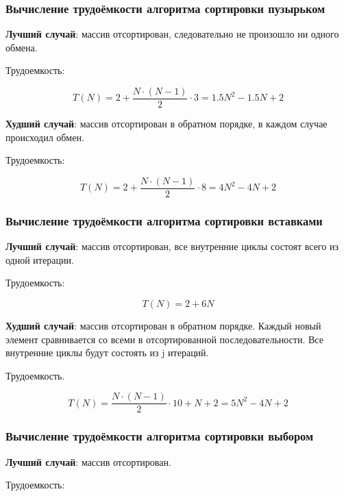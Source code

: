 \documentclass[14pt,russian]{scrartcl}
\begin{document}
\subsubsection{Вычисление трудоёмкости алгоритма сортировки пузырьком}

\textbf{Лучший случай}: массив отсортирован, следовательно не произошло ни одного обмена.

Трудоемкость:

\begin{equation}
    T(N) = 2 + \frac{N \cdot (N - 1)}{2}\cdot 3 = 1.5N^2 - 1.5N + 2
\end{equation}

\textbf{Худший случай}: массив отсортирован в обратном порядке, в каждом случае происходил обмен.

Трудоемкость:

\begin{equation}
    T(N) = 2 + \frac{N \cdot (N - 1)}{2}\cdot 8 = 4N^2 - 4N + 2
\end{equation}

\subsubsection{Вычисление трудоёмкости алгоритма сортировки вставками}

\textbf{Лучший случай}: массив отсортирован, все внутренние циклы состоят всего из одной итерации.

Трудоемкость:

\begin{equation}
    T(N) = 2 + 6N
\end{equation}

\textbf{Худший случай}: массив отсортирован в обратном порядке. Каждый новый элемент сравнивается со всеми в отсортированной последовательности. Все внутренние циклы будут состоять из j итераций.

Трудоемкость.

\begin{equation}
    T(N) = \frac{N \cdot (N - 1)}{2} \cdot 10 + N + 2 = 5N^2 - 4N + 2
\end{equation}

\subsubsection{Вычисление трудоёмкости алгоритма сортировки выбором}

\textbf{Лучший случай}: массив отсортирован.

Трудоемкость:
\end{document}
